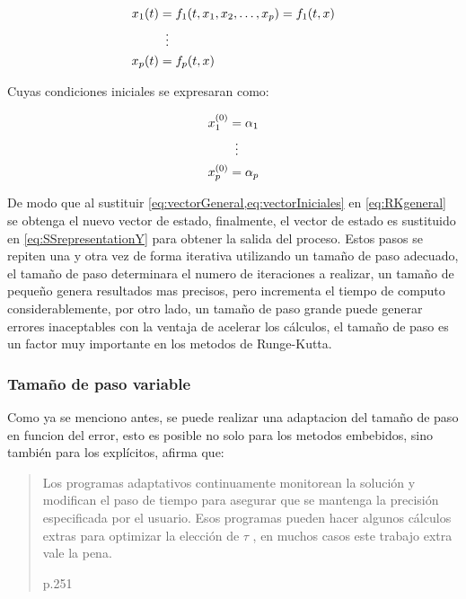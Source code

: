             
            \begin{equation}\label{eq:vectorGeneral}
                \begin{aligned}
                    x_1(t) &= f_1(t, x_1, x_2, \dots, x_p) = f_1(t,x)\\
                    &\mathrel{\makebox[\widthof{=}]{\vdots}}\\
                    x_p(t) &=  f_p(t,x)
                \end{aligned}
            \end{equation}

            Cuyas condiciones iniciales se expresaran como:

            \begin{equation}\label{eq:vectorIniciales}
                \begin{aligned}
                    x_1^{(0)} &= \alpha_1\\
                    &\mathrel{\makebox[\widthof{=}]{\vdots}}\\
                    x_p^{(0)} &=  \alpha_p
                \end{aligned}
            \end{equation}
            
            De modo que al sustituir \cref{eq:vectorGeneral,eq:vectorIniciales} en \cref{eq:RKgeneral} se obtenga el nuevo vector de estado, finalmente, el vector de estado es sustituido en \cref{eq:SSrepresentationY} para obtener la salida del proceso. Estos pasos se repiten una y otra vez de forma iterativa utilizando un tamaño de paso adecuado, el tamaño de paso determinara el numero de iteraciones a realizar, un tamaño de pequeño genera resultados mas precisos, pero incrementa el tiempo de computo considerablemente, por otro lado, un tamaño de paso grande puede generar errores inaceptables con la ventaja de acelerar los cálculos, el tamaño de paso es un factor muy importante en los metodos de Runge-Kutta.

        \subsubsection{Tamaño de paso variable}

            Como ya se menciono antes, se puede realizar una adaptacion del tamaño de paso en funcion del error, esto es posible no solo para los metodos embebidos, sino también para los explícitos, \textcite{roganprogramacion} afirma que: \blockquote[p.251]{Los programas adaptativos continuamente monitorean la solución y modifican el paso de
            tiempo para asegurar que se mantenga la precisión especificada por el usuario. Esos programas
            pueden hacer algunos cálculos extras para optimizar la elección de $\tau$ , en muchos casos este
            trabajo extra vale la pena.}
            

